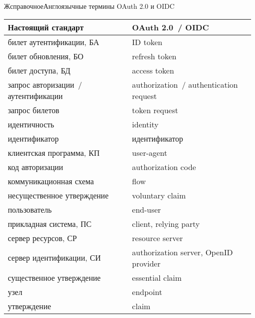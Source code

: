 \begin{appendix}{Ж}{справочное}{Англоязычные термины OAuth 2.0 и OIDC}\label{ENG}

\mbox{}

\begin{center}
\begin{tabular}{|p{8cm}|p{8cm}|}
\hline
Настоящий стандарт & OAuth 2.0~/ OIDC\\
\hline
\hline
билет аутентификации, БА & ID token\\
билет обновления, БО & refresh token\\
билет доступа, БД & access token\\
запрос авторизации~/ аутентификации & 
authorization~/ authentication request\\
запрос билетов & token request\\
идентичность & identity\\
идентификатор & идентификатор\\
клиентская программа, КП & user-agent\\
код авторизации & authorization code\\
коммуникационная схема & flow\\
несущественное утверждение & voluntary claim\\
пользователь & end-user\\
прикладная система, ПС & client, relying party\\
сервер ресурсов, СР & resource server\\
сервер идентификации, СИ & authorization server, OpenID provider\\
существенное утверждение & essential claim\\
узел & endpoint\\
утверждение & claim\\
\hline
\end{tabular}
\end{center}

\end{appendix}